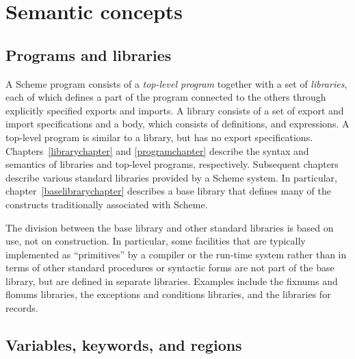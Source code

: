 \chapter{Semantic concepts}
\label{basicchapter}

\section{Programs and libraries}

A Scheme program consists of a \textit{top-level program}
together with a set of \textit{libraries}, each
of which defines a part of the program connected to the others through
explicitly specified exports and imports.  A library consists of a set
of export and import specifications and a body, which consists of
definitions, and expressions.
A top-level program is similar to a library, but
has no export specifications.
Chapters~\ref{librarychapter} and \ref{programchapter}
describe the syntax and semantics of libraries and top-level programs,
respectively.  Subsequent chapters
describe various standard libraries provided by a Scheme system.  In
particular, chapter~\ref{baselibrarychapter} describes a base
library that defines many of the constructs traditionally associated with
Scheme.

The division between the base library and other standard libraries is
based on use, not on construction.  In particular, some facilities
that are typically implemented as ``primitives'' by a compiler or the
run-time system rather than in terms of other standard procedures
 or syntactic forms are not part of the base library, but are defined in
separate libraries.  Examples include the fixnums and flonums libraries,
the exceptions and conditions libraries, and the libraries for
records.

\section{Variables, keywords, and regions}
\label{specialformsection}
\label{variablesection}

